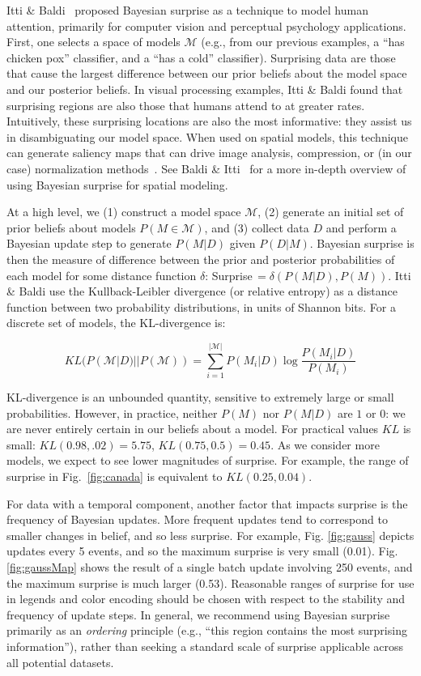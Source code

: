 \documentclass[journal]{vgtc}                %
\begin{document}
Itti \& Baldi~\cite{itti2005bayesian} proposed Bayesian surprise as a technique to model human attention, primarily for computer vision and perceptual psychology applications. First, one selects a space of models $\mathcal{M}$ (e.g., from our previous examples, a ``has chicken pox'' classifier, and a ``has a cold'' classifier). Surprising data are those that cause the largest difference between our prior beliefs about the model space and our posterior beliefs. In visual processing examples, Itti \& Baldi found that surprising regions are also those that humans attend to at greater rates. Intuitively, these surprising locations are also the most informative: they assist us in disambiguating our model space. When used on spatial models, this technique can generate saliency maps that can drive image analysis, compression, or (in our case) normalization methods~\cite{gkioulekas2010spatial}. See Baldi \& Itti~\cite{baldi2010bits} for a more in-depth overview of using Bayesian surprise for spatial modeling.

At a high level, we (1) construct a model space $\mathcal{M}$, (2) generate an initial set of prior beliefs about models $P(M \in \mathcal{M})$, and (3) collect data $D$ and perform a Bayesian update step to generate $P(M|D)$ given $P(D|M)$. Bayesian surprise is then the measure of difference between the prior and posterior probabilities of each model for some distance function $\delta$: Surprise\,$=\delta(P(M|D), P(M))$. Itti \& Baldi use the Kullback-Leibler divergence (or relative entropy) as a distance function between two probability distributions, in units of Shannon bits. For a discrete set of models, the KL-divergence is:

$$ KL(P(\mathcal{M}|D)||P(\mathcal{M})) = \sum_{i=1}^{|\mathcal{M}|} P(M_i|D) \log\frac{P(M_i|D)}{P(M_i)} $$

KL-divergence is an unbounded quantity, sensitive to extremely large or small probabilities. However, in practice, neither $P(M)$ nor $P(M|D)$ are $1$ or $0$: we are never entirely certain in our beliefs about a model. For practical values $KL$ is small: $KL(0.98,.02)=5.75$, $KL(0.75,0.5)=0.45$. As we consider more models, we expect to see lower magnitudes of surprise. For example, the range of surprise in Fig.~\ref{fig:canada} is equivalent to $KL(0.25,0.04)$.

For data with a temporal component, another factor that impacts surprise is the frequency of Bayesian updates. More frequent updates tend to correspond to smaller changes in belief, and so less surprise. For example, Fig. \ref{fig:gauss} depicts updates every 5 events, and so the maximum surprise is very small (0.01). Fig. \ref{fig:gaussMap} shows the result of a single batch update involving 250 events, and the maximum surprise is much larger (0.53). Reasonable ranges of surprise for use in legends and color encoding should be chosen with respect to the stability and frequency of update steps. In general, we recommend using Bayesian surprise primarily as an \emph{ordering} principle (e.g., ``this region contains the most surprising information''), rather than seeking a standard scale of surprise applicable across all potential datasets.
\end{document}
